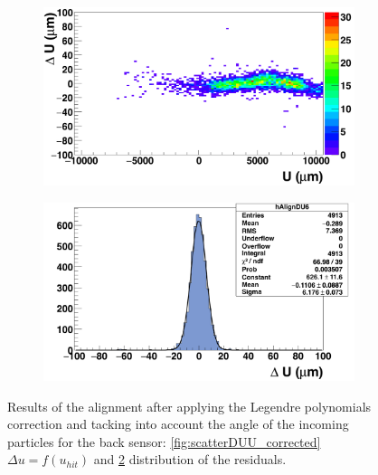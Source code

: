 \begin{figure}[!h]
        \begin{subfigure}[t]{0.45\textwidth}
          \centering
          \includegraphics[width = 1.2\textwidth]{Pictures/deformation/deltaUU_6_corrected1.png}
          \caption{}
          \label{fig:scatterDUU_corrected_back}
        \end{subfigure}
        \hfill
        \begin{subfigure}[t]{0.45\textwidth}
          \centering
          \includegraphics[width = 1.2\textwidth]{Pictures/deformation/deltaU_6_corrected1.png}
          \caption{}
          \label{fig:residualU_corrected_back}
        \end{subfigure}
        \caption{Results of the alignment after applying the Legendre polynomials correction and tacking into account the angle of the incoming particles for the back sensor: \ref{fig:scatterDUU_corrected} $\Delta u=f(u_{hit})$ and \ref{fig:residualU_corrected_back} distribution of the residuals.}
        \label{fig:alignmnetCorrected_back}

      \end{figure}

